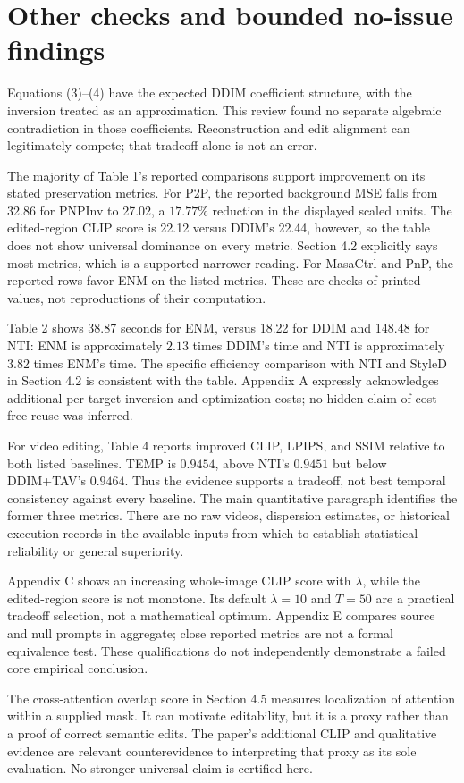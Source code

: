 \documentclass[10pt]{article}
\begin{document}
\section*{Other checks and bounded no-issue findings}
Equations (3)–(4) have the expected DDIM coefficient structure, with the inversion treated as an approximation. This review found no separate algebraic contradiction in those coefficients. Reconstruction and edit alignment can legitimately compete; that tradeoff alone is not an error.\par
The majority of Table 1’s reported comparisons support improvement on its stated preservation metrics. For P2P, the reported background MSE falls from 32.86 for PNPInv to 27.02, a \(17.77\%\) reduction in the displayed scaled units. The edited-region CLIP score is 22.12 versus DDIM’s 22.44, however, so the table does not show universal dominance on every metric. Section 4.2 explicitly says most metrics, which is a supported narrower reading. For MasaCtrl and PnP, the reported rows favor ENM on the listed metrics. These are checks of printed values, not reproductions of their computation.\par
Table 2 shows 38.87 seconds for ENM, versus 18.22 for DDIM and 148.48 for NTI: ENM is approximately \(2.13\) times DDIM’s time and NTI is approximately \(3.82\) times ENM’s time. The specific efficiency comparison with NTI and StyleD in Section 4.2 is consistent with the table. Appendix A expressly acknowledges additional per-target inversion and optimization costs; no hidden claim of cost-free reuse was inferred.\par
For video editing, Table 4 reports improved CLIP, LPIPS, and SSIM relative to both listed baselines. TEMP is \(0.9454\), above NTI’s \(0.9451\) but below DDIM+TAV’s \(0.9464\). Thus the evidence supports a tradeoff, not best temporal consistency against every baseline. The main quantitative paragraph identifies the former three metrics. There are no raw videos, dispersion estimates, or historical execution records in the available inputs from which to establish statistical reliability or general superiority.\par
Appendix C shows an increasing whole-image CLIP score with \(\lambda\), while the edited-region score is not monotone. Its default \(\lambda=10\) and \(T=50\) are a practical tradeoff selection, not a mathematical optimum. Appendix E compares source and null prompts in aggregate; close reported metrics are not a formal equivalence test. These qualifications do not independently demonstrate a failed core empirical conclusion.\par
The cross-attention overlap score in Section 4.5 measures localization of attention within a supplied mask. It can motivate editability, but it is a proxy rather than a proof of correct semantic edits. The paper’s additional CLIP and qualitative evidence are relevant counterevidence to interpreting that proxy as its sole evaluation. No stronger universal claim is certified here.\par
\end{document}
